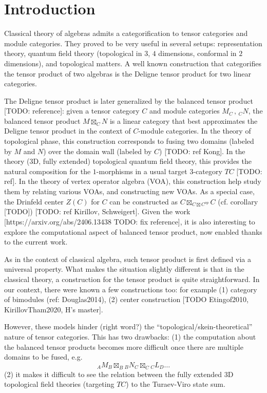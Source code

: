 
\section{Introduction}

Classical theory of algebras admits a categorification to tensor categories
and module categories. They proved to be very useful in several setups:
representation theory, quantum field theory (topological in $3$, $4$
dimensions, conformal in $2$ dimensions), and topological matters. A well
known construction that categorifies the tensor product of two algebras is the
Deligne tensor product for two linear categories.

The Deligne tensor product is later generalized by the balanced tensor product
[TODO: reference]: given a tensor category $C$ and module categories
$M_{C} \,,\, {}_{C}N$, the balanced tensor product $M \boxtimes_{C} N$ is a linear
category that best approximates the Deligne tensor product in the context of
$C$-module categories. In the theory of topological phase, this construction
corresponds to fusing two domains (labeled by $M$ and $N$) over the domain
wall (labeled by $C$) [TODO: ref Kong]. In the theory ($3$D, fully extended)
topological quantum field theory, this provides the natural composition for
the $1$-morphisms in a usual target $3$-category $TC$ [TODO: ref]. In the
theory of vertex operator algebra (VOA), this construction help study them by
relating various VOAs, and constructing new VOAs. As a special case, the
Drinfeld center $Z(C)$ for $C$ can be constructed as $C \boxtimes_{C \boxtimes C^{op}} C$ (cf.
corollary [TODO]) [TODO: ref Kirillov, Schweigert]. Given the work
[https://arxiv.org/abs/2406.13438 TODO: fix reference], it is also interesting
to explore the computational aspect of balanced tensor product, now enabled
thanks to the current work.

As in the context of classical algebra, such tensor product is first defined
via a universal property. What makes the situation slightly different is that
in the classical theory, a construction for the tensor product is quite
straightforward. In our context, there were known a few constructions too: for
example (1) category of bimodules (ref: Douglas2014), (2) center construction
[TODO Etingof2010, KirillovTham2020, H's master].

However, these models hinder (right word?) the
``topological/skein-theoretical'' nature of tensor categories. This has two drawbacks: (1) the computation about the balanced tensor products becomes more difficult once there are multiple domains to be fused, e.g.
\[ {}_{A}{M}_{B} \boxtimes_{B} {}_{B}{N}_{C} \boxtimes_{{C}} {}_{C}{L}_{D} \ldots
\]
(2) it makes it difficult to see the relation between the fully extended $3$D
topological field theories (targeting $TC$) to the Turaev-Viro state sum.

